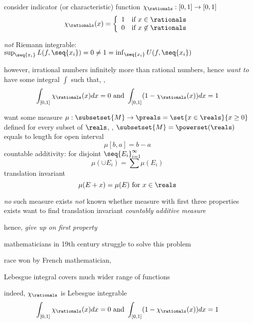 \documentclass[17pt,landscape]{foils}
\begin{document}
{{%

\bit
	\item consider indicator (or characteristic) function $\chi_\rationals:[0,1] \to [0,1]$
	\[
		\chi_\rationals(x) = \left\{\begin{array}{ll}
			1 &\mbox{if } x \in \rationals
			\\
			0 &\mbox{if } x \not\in \rationals
		\end{array}\right.
	\]

	\vitem \emph{not} Riemann integrable: $\sup_{\seq{x_i}} L(f,\seq{x_i}) = 0 \neq 1 = \inf_{\seq{x_i}} U(f,\seq{x_i})$

	\vitem however, irrational numbers infinitely more than rational numbers, hence
	\bit
		\vitem \emph{want to} have some integral $\int$ such that, \eg,
		\[
			\int_{[0,1]} \chi_\rationals(x) dx = 0
			\mbox{ and }
			\int_{[0,1]} (1-\chi_\rationals(x)) dx = 1
		\]
	\eit
\eit


%

\bit
	\item want some measure $\mu:\subsetset{M}\to\preals=\set{x\in\reals}{x\geq0}$
	\bit
		\vitem defined for every subset of $\reals$, \ie, $\subsetset{M} = \powerset(\reals)$
		\vitem equals to length for open interval
			\[
				\mu[b,a] = b-a
			\]
		\vitem countable additivity: for disjoint $\seq{E_i}_{i=1}^\infty$\[ \mu(\cup E_i) = \sum \mu(E_i)\]
		\vitem translation invariant \[\mu(E+x) = \mu(E) \mbox{ for } x\in\reals\]
	\eit

	\vitem \emph{no} such measure exists
	\vitem \emph{not} known whether measure with first three properties exists
	\vitem want to find translation invariant \emph{countably additive measure}
	\bit
		\item hence, \emph{give up on first property}
	\eit
\eit



\bit
	\item mathematicians in 19th century struggle to solve this problem

	\vitem race won by French mathematician, %

	\vitem Lebesgue integral covers much wider range of functions
	\bit
		\item indeed, $\chi_\rationals$ is Lebesgue integrable
		\[
				\int_{[0,1]} \chi_\rationals(x) dx = 0
				\mbox{ and }
				\int_{[0,1]} (1-\chi_\rationals(x)) dx = 1
		\]
	\eit
\eit


}}
\end{document}
